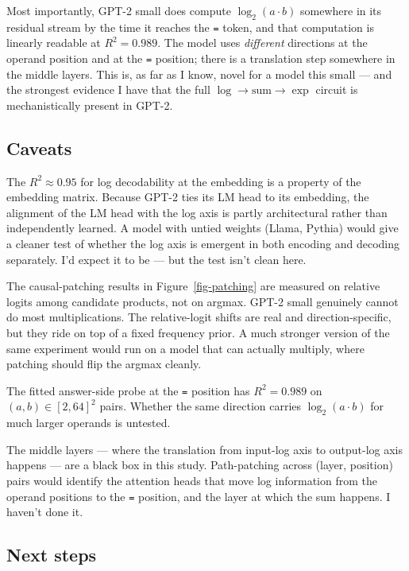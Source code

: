 \documentclass[
]{article}
\begin{document}
Most importantly, GPT-2 small does compute \(\log_2(a \cdot b)\)
somewhere in its residual stream by the time it reaches the \texttt{=}
token, and that computation is linearly readable at \(R^2 = 0.989\). The
model uses \emph{different} directions at the operand position and at
the \texttt{=} position; there is a translation step somewhere in the
middle layers. This is, as far as I know, novel for a model this small
--- and the strongest evidence I have that the full
\(\log \to \mathrm{sum} \to \exp\) circuit is mechanistically present in
GPT-2.

\subsection{Caveats}\label{sec-caveats}

The \(R^2 \approx 0.95\) for log decodability at the embedding is a
property of the embedding matrix. Because GPT-2 ties its LM head to its
embedding, the alignment of the LM head with the log axis is partly
architectural rather than independently learned. A model with untied
weights (Llama, Pythia) would give a cleaner test of whether the log
axis is emergent in both encoding and decoding separately. I'd expect it
to be --- but the test isn't clean here.

The causal-patching results in Figure~\ref{fig-patching} are measured on
relative logits among candidate products, not on argmax. GPT-2 small
genuinely cannot do most multiplications. The relative-logit shifts are
real and direction-specific, but they ride on top of a fixed frequency
prior. A much stronger version of the same experiment would run on a
model that can actually multiply, where patching should flip the argmax
cleanly.

The fitted answer-side probe at the \texttt{=} position has
\(R^2 = 0.989\) on \((a, b) \in [2, 64]^2\) pairs. Whether the same
direction carries \(\log_2(a \cdot b)\) for much larger operands is
untested.

The middle layers --- where the translation from input-log axis to
output-log axis happens --- are a black box in this study. Path-patching
across (layer, position) pairs would identify the attention heads that
move log information from the operand positions to the \texttt{=}
position, and the layer at which the sum happens. I haven't done it.

\subsection{Next steps}\label{sec-next}
\end{document}
